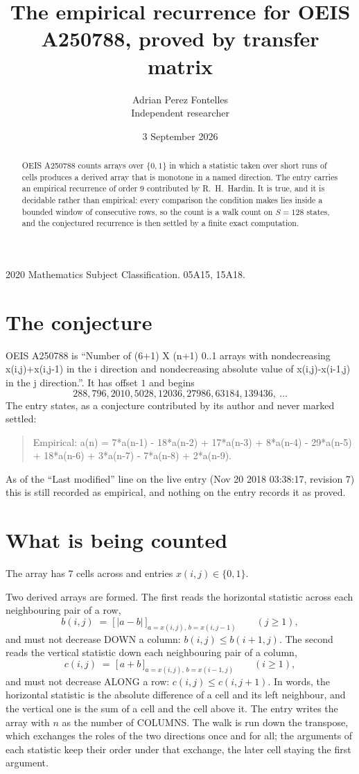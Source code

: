\documentclass[11pt,a4paper]{article}
\title{The empirical recurrence for OEIS A250788, proved by transfer matrix}
\author{Adrian Perez Fontelles\\ \small Independent researcher}
\date{3 September 2026}
\theoremstyle{plain}
\theoremstyle{definition}
\begin{document}
\maketitle

\begin{abstract}
OEIS A250788 counts arrays over $\{0,1\}$ in which a statistic taken over short runs
of cells produces a derived array that is monotone in a named direction. The entry carries an
empirical recurrence of order $9$ contributed by R.~H.~Hardin. It is true, and it is
decidable rather than empirical: every comparison the condition makes lies inside a bounded
window of consecutive rows, so the count is a walk count on $S=128$ states, and the
conjectured recurrence is then settled by a finite exact computation.
\end{abstract}

\noindent\small 2020 Mathematics Subject Classification. 05A15, 15A18.\normalsize

\section{The conjecture}

OEIS A250788 is ``Number of (6+1) X (n+1) 0..1 arrays with nondecreasing x(i,j)+x(i,j-1) in the i direction and nondecreasing absolute value of x(i,j)-x(i-1,j) in the j direction.''. It has offset $1$ and begins
\[
288, 796, 2010, 5028, 12036, 27986, 63184, 139436,\ \dots
\]
The entry states, as a conjecture contributed by its author and never marked settled:
\begin{quote}
Empirical: a(n) = 7*a(n-1) - 18*a(n-2) + 17*a(n-3) + 8*a(n-4) - 29*a(n-5) + 18*a(n-6) + 3*a(n-7) - 7*a(n-8) + 2*a(n-9).
\end{quote}
As of the ``Last modified'' line on the live entry (Nov 20 2018 03:38:17, revision 7) this is still
recorded as empirical, and nothing on the entry records it as proved.

\section{What is being counted}

The array has $7$ cells across and entries $x(i,j)\in\{0,1\}$.

Two derived arrays are formed. The first reads the horizontal statistic across each
neighbouring pair of a row,
\[
b(i,j)\;=\;\bigl[\,\lvert a-b\rvert\,\bigr]_{a=x(i,j),\,b=x(i,j-1)}\qquad (j\ge1),
\]
and must not decrease DOWN a column: $b(i,j)\le b(i{+}1,j)$. The second reads the vertical
statistic down each neighbouring pair of a column,
\[
c(i,j)\;=\;\bigl[\,a+b\,\bigr]_{a=x(i,j),\,b=x(i{-}1,j)}\qquad (i\ge1),
\]
and must not decrease ALONG a row: $c(i,j)\le c(i,j{+}1)$. In words, the horizontal statistic
is the absolute difference of a cell and its left neighbour, and the vertical one is
the sum of a cell and the cell above it. The entry writes the array with $n$ as the number of COLUMNS. The walk is run down the transpose, which exchanges the roles of the two directions once and for all; the arguments of each statistic keep their order under that exchange, the later cell staying the first argument.
\end{document}
